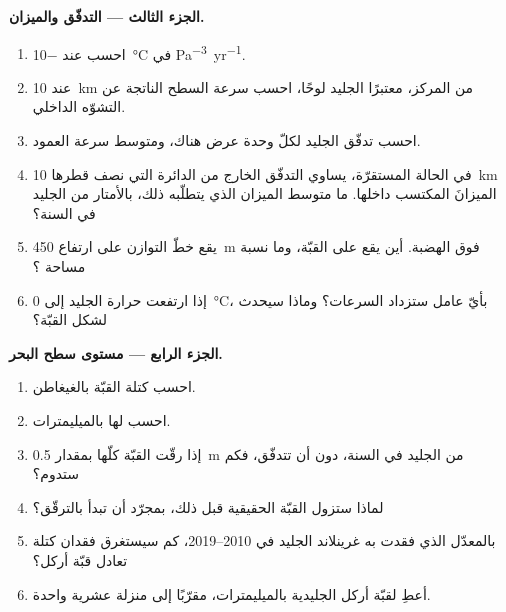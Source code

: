 \begin{problem}
\medskip\noindent\textbf{الجزء الثالث --- التدفّق والميزان.}
\begin{enumerate}[resume]
\item احسب  عند \qty{-10}{\celsius} في
  \unit{Pa^{-3}.yr^{-1}}.
\item عند \qty{10}{km} من المركز، معتبرًا الجليد لوحًا، احسب
  سرعة السطح الناتجة عن التشوّه الداخلي.
\item احسب تدفّق الجليد لكلّ وحدة عرض هناك، ومتوسط سرعة
  العمود.
\item في الحالة المستقرّة، يساوي التدفّق الخارج من الدائرة التي نصف قطرها
  \qty{10}{km} الميزانَ المكتسب داخلها. ما متوسط الميزان
  الذي يتطلّبه ذلك، بالأمتار من الجليد في السنة؟
\item يقع خطّ التوازن على ارتفاع \qty{450}{m} فوق الهضبة. أين يقع
  على القبّة، وما نسبة مساحة ؟
\item إذا ارتفعت حرارة الجليد إلى \qty{0}{\celsius}، بأيّ عامل ستزداد
  السرعات؟ وماذا سيحدث لشكل القبّة؟
\end{enumerate}

\medskip\noindent\textbf{الجزء الرابع --- مستوى سطح البحر.}
\begin{enumerate}[resume]
\item احسب كتلة القبّة بالغيغاطن.
\item احسب  لها بالميليمترات.
\item إذا رقّت القبّة كلّها بمقدار \qty{0.5}{m} من الجليد في السنة، دون
  أن تتدفّق، فكم ستدوم؟
\item لماذا ستزول القبّة الحقيقية قبل ذلك، بمجرّد أن تبدأ
  بالترقّق؟
\item بالمعدّل الذي فقدت به غرينلاند الجليد في 2010--2019، كم سيستغرق
  فقدان كتلة تعادل قبّة أركل؟
\item أعطِ  لقبّة أركل الجليدية بالميليمترات،
  مقرّبًا إلى منزلة عشرية واحدة.
\end{enumerate}
\end{problem}
